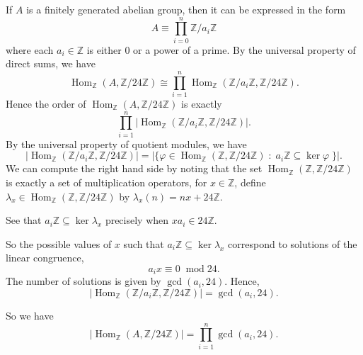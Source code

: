 \documentclass[10pt]{article}
\newenvironment{proof}[1][Proof]{\begin{trivlist}
\item[\hskip \labelsep {\bfseries #1}]}{\end{trivlist}}
\newcommand{\isom}{\cong}
\newcommand{\modulo}[1]{\;\operatorname{mod} #1}
\newcommand{\Hom}{\operatorname{Hom}}
\begin{document}
\begin{proof}
    If $A$ is a finitely generated abelian group, then it can be expressed in the form
    \begin{equation*}
        A\equiv \prod_{i=0}^n\mathbb{Z}/a_i\mathbb{Z}
    \end{equation*}
    where each $a_i \in \mathbb{Z}$ is either $0$ or a power of a prime.
    By the universal property of direct sums, we have
    \begin{equation*}
        \Hom_\mathbb{Z}(A,\mathbb{Z}/24\mathbb{Z}) \isom \prod_{i=1}^n\Hom_\mathbb{Z}(\mathbb{Z}/a_i\mathbb{Z},\mathbb{Z}/24\mathbb{Z}).
    \end{equation*}
    Hence the order of $\Hom_\mathbb{Z}(A,\mathbb{Z}/24\mathbb{Z})$ is exactly
    \begin{equation*}
        \prod_{i=1}^n|\Hom_\mathbb{Z}(\mathbb{Z}/a_i\mathbb{Z},\mathbb{Z}/24\mathbb{Z})|.
    \end{equation*} 
    By the universal property of quotient modules, we have
    \begin{equation*}
        |\Hom_\mathbb{Z}(\mathbb{Z}/a_i\mathbb{Z},\mathbb{Z}/24\mathbb{Z})| = |\{\varphi\in\Hom_\mathbb{Z}(\mathbb{Z},\mathbb{Z}/24\mathbb{Z})\;:\; a_i\mathbb{Z} \subseteq \ker\varphi\;\}|.
    \end{equation*}
    We can compute the
    right hand side by noting that the set $\Hom_\mathbb{Z}(\mathbb{Z},\mathbb{Z}/24\mathbb{Z})$ is exactly
    a set of multiplication operators, for $x\in \mathbb{Z}$, define $\lambda_x \in\Hom_\mathbb{Z}(\mathbb{Z},\mathbb{Z}/24\mathbb{Z})$
    by $\lambda_x(n) = nx+24\mathbb{Z}$. 
    
    See that $a_i\mathbb{Z}\subseteq\ker\lambda_x$ precisely when $xa_i\in24\mathbb{Z}$.
    
    So the possible values of $x$ such that $a_i\mathbb{Z}\subseteq\ker\lambda_x$
    correspond to solutions of the linear congruence,
    \begin{equation*}
        a_i x\equiv 0\modulo{24}.
    \end{equation*}
    The number of solutions is given by $\gcd(a_i,24)$. Hence,
    \begin{equation*}
        |\Hom_\mathbb{Z}(\mathbb{Z}/a_i\mathbb{Z},\mathbb{Z}/24\mathbb{Z})| = \gcd(a_i,24).
    \end{equation*}
    
    So we have
    \begin{equation*}
        |\Hom_\mathbb{Z}(A,\mathbb{Z}/24\mathbb{Z})| = \prod_{i=1}^n \gcd(a_i,24).
    \end{equation*}
    

\end{proof}
\end{document}
